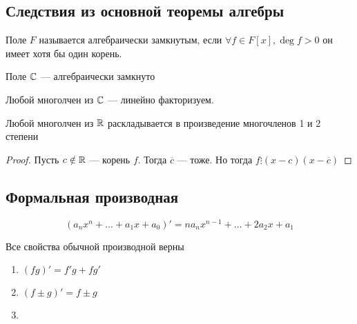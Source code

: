 \subsection{Следствия из основной теоремы алгебры}
\begin{definition}
    Поле \(F\) называется алгебраически замкнутым, если \(\forall f \in F[x], \deg f > 0\) он имеет хотя бы один корень.
\end{definition}
\begin{corollary}
    Поле \(\mathbb{C}\) --- алгебраически замкнуто
\end{corollary}
\begin{corollary}
    Любой многолчен из \(\mathbb{C}\) --- линейно факторизуем.
\end{corollary}
\begin{corollary}
    Любой многолчен из \(\mathbb{R}\) раскладывается в произведение многочленов 1 и 2 степени
\end{corollary}
\begin{proof}
    Пусть \(c \notin \mathbb{R}\) --- корень \(f\). Тогда \(\overline{c}\) --- тоже. Но тогда \(f \vdots (x - c)(x - \overline{c})\)
\end{proof}

\subsection{Формальная производная}
\begin{definition}
    \[(a_nx^n + \dots + a_1x + a_0)' = na_nx^{n-1} + \dots + 2a_2x + a_1\]
\end{definition}
\begin{note}
    Все свойства обычной производной верны
    \begin{enumerate}
        \item \((fg)' = f'g + fg'\)
        \item \((f \pm g)' = f \pm g\)
        \item \(\)
    \end{enumerate}
\end{note}